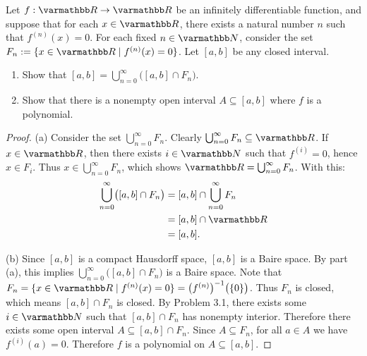 \documentclass[10pt,twoside,openany]{memoir}
\begin{document}
\begin{problem}[manual-num={2}]
Let $f:\bfR \rightarrow \bfR$ be an infinitely differentiable function, and suppose that for each $x \in \bfR$, there exists a natural number $n$ such that $f^{(n)}(x) = 0$. For each fixed $n \in \bfN$, consider the set $F_n := \{x \in \bfR \mid f^{(n)}(x) = 0\}$. Let $[a,b]$ be any closed interval.
\begin{enumerate}[label = (\alph*),itemsep=1pt,topsep=3pt]
    \item Show that $[a,b] = \bigcup_{n = 0}^\infty \bigl([a,b] \cap F_n\bigr)$.
    \item Show that there is a nonempty open interval $A \subseteq [a,b]$ where $f$ is a polynomial.
\end{enumerate}
\end{problem}
    \begin{proof}
        (a) Consider the set $\bigcup_{n = 0}^\infty F_n$. Clearly $\bigcup_{n = 0}^\infty F_n \subseteq \bfR$. If $x \in \bfR$, then there exists $i \in \bfN$ such that $f^{(i)} = 0$, hence $x \in F_i$. Thus $x \in \bigcup_{n = 0}^\infty F_n$, which shows $\bfR = \bigcup_{n = 0}^\infty F_n$. With this:
            \begin{equation*}
            \begin{split}
                \bigcup_{n = 0}^\infty \bigl( [a,b] \cap F_n \bigr)
                & =[a,b] \cap \bigcup_{n = 0}^\infty F_n \\
                & = [a,b] \cap \bfR \\
                & = [a,b].
            \end{split}
            \end{equation*}

        (b) Since $[a,b]$ is a compact Hausdorff space, $[a,b]$ is a Baire space. By part (a), this implies $\bigcup_{n = 0}^\infty \bigl([a,b] \cap F_n\bigr)$ is a Baire space. Note that $F_n = \{x \in \bfR \mid f^{(n)}(x) = 0\} = \bigl(f^{(n)}\bigr)^{-1}\bigl(\{0\}\bigr)$. Thus $F_n$ is closed, which means $[a,b] \cap F_n$ is closed. By Problem 3.1, there exists some $i \in \bfN$ such that $[a,b] \cap F_n$ has nonempty interior. Therefore there exists some open interval $A \subseteq [a,b] \cap F_n$. Since $A \subseteq F_n$, for all $a \in A$ we have $f^{(i)}(a) = 0$. Therefore $f$ is a polynomial on $A \subseteq [a,b]$.
    \end{proof}
    
\end{document}
